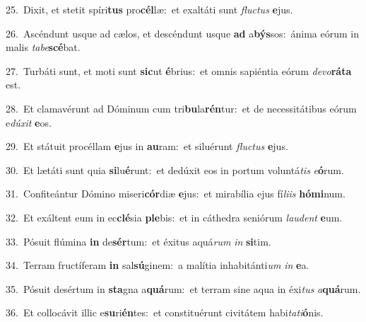 {\numbfont\textcolor{\numbcolor}{25.}}~Dixit, et stetit spíri\textbf{tus} pro\-\textbf{cél}\-læ:~\star et exaltáti sunt \textit{fluc}\-\textit{tus} \textbf{e}\-jus.\par
{\numbfont\textcolor{\numbcolor}{26.}}~Ascéndunt usque ad cælos, et descéndunt usque \textbf{ad} a\-\textbf{býs}\-sos:~\star ánima eórum in malis \textit{ta}\-\textit{be}\textbf{scé}bat.\par
{\numbfont\textcolor{\numbcolor}{27.}}~Turbáti sunt, et moti sunt \textbf{sic}\-ut \textbf{é}\-brius:~\star et omnis sapiéntia eórum \textit{de}\-\textit{vo}\textbf{rá}\textbf{ta} est.\par
{\numbfont\textcolor{\numbcolor}{28.}}~Et clamavérunt ad Dóminum cum tri\-\textbf{bu}\-la\-\textbf{rén}\-tur:~\star et de necessitátibus eórum e\-\textit{dú}\-\textit{xit} \textbf{e}\-os.\par
{\numbfont\textcolor{\numbcolor}{29.}}~Et státuit procéllam \textbf{e}\-jus in \textbf{au}\-ram:~\star et siluérunt \textit{fluc}\-\textit{tus} \textbf{e}\-jus.\par
{\numbfont\textcolor{\numbcolor}{30.}}~Et lætáti sunt quia \textbf{si}\-lu\-\textbf{é}\-runt:~\star et dedúxit eos in portum voluntá\textit{tis} \textit{e}\-\textbf{ó}rum.\par
{\numbfont\textcolor{\numbcolor}{31.}}~Confiteántur Dómino miseri\-\textbf{cór}\-diæ \textbf{e}\-jus:~\star et mirabília ejus fí\-\textit{li}\-\textit{is} \textbf{hó}\-\textbf{mi}num.\par
{\numbfont\textcolor{\numbcolor}{32.}}~Et exáltent eum in ec\-\textbf{clé}\-sia \textbf{ple}\-bis:~\star et in cáthedra seniórum \textit{lau}\-\textit{dent} \textbf{e}\-um.\par
{\numbfont\textcolor{\numbcolor}{33.}}~Pósuit flúmina \textbf{in} de\-\textbf{sér}\-tum:~\star et éxitus aquá\textit{rum} \textit{in} \textbf{si}\-tim.\par
{\numbfont\textcolor{\numbcolor}{34.}}~Terram fructíferam \textbf{in} sal\-\textbf{sú}\-ginem:~\star a malítia inhabitánti\textit{um} \textit{in} \textbf{e}\-a.\par
{\numbfont\textcolor{\numbcolor}{35.}}~Pósuit desértum in \textbf{sta}\-gna a\-\textbf{quá}\-rum:~\star et terram sine aqua in éxi\textit{tus} \textit{a}\-\textbf{quá}rum.\par
{\numbfont\textcolor{\numbcolor}{36.}}~Et collocávit illic e\-\textbf{su}\-ri\-\textbf{én}\-tes:~\star et constituérunt civitátem habi\-\textit{ta}\-\textit{ti}\textbf{ó}nis.\par
